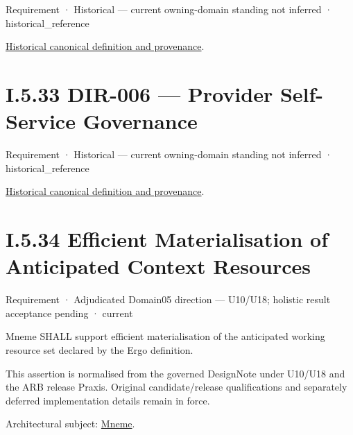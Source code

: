 \label{element:097368b4b0b4468dbf1c57c11d9ed86c}
{\small Requirement · Historical — current owning-domain standing not inferred · historical\_reference}\par
\href{../../../../continuum/motivation/requirement/097368b4b0b4468dbf1c57c11d9ed86c.md}{Historical canonical definition and provenance}.\par
\section*{I.5.33 DIR-006 — Provider Self-Service Governance}
\label{navigation:I.5.33}

\label{element:4230f93461a4470383fb99fddc35f8bf}
{\small Requirement · Historical — current owning-domain standing not inferred · historical\_reference}\par
\href{../../../../continuum/motivation/requirement/4230f93461a4470383fb99fddc35f8bf.md}{Historical canonical definition and provenance}.\par
\section*{I.5.34 Efficient Materialisation of Anticipated Context Resources}
\label{navigation:I.5.34}

\label{element:1f3431ca25284783ac69f8f6affcd103}
{\small Requirement · Adjudicated Domain05 direction — U10/U18; holistic result acceptance pending · current}\par

Mneme SHALL support efficient materialisation of the anticipated working resource set declared by the Ergo definition.



This assertion is normalised from the governed DesignNote under U10/U18 and the ARB release Praxis. Original candidate/release qualifications and separately deferred implementation details remain in force.



Architectural subject: \hyperref[element:1af8a56358f7429fabfb57be66542a99]{Mneme}.


